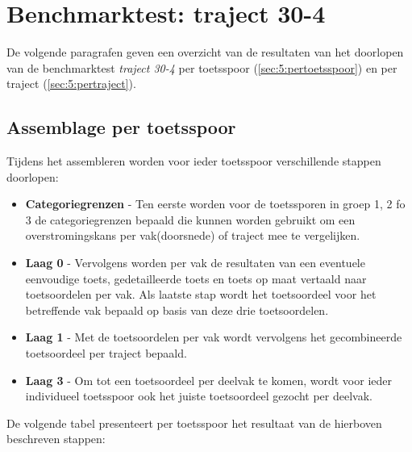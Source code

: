 \section{Benchmarktest: traject 30-4}
	\label{ch:benchmarktTest5}
De volgende paragrafen geven een overzicht van de resultaten van het doorlopen van de benchmarktest \textit{traject 30-4} per toetsspoor (\autoref{sec:5:pertoetsspoor}) en per traject (\autoref{sec:5:pertraject}).

\subsection{Assemblage per toetsspoor}
	\label{sec:5:pertoetsspoor}
Tijdens het assembleren worden voor ieder toetsspoor verschillende stappen doorlopen:
\begin{itemize}
	\item \textbf{Categoriegrenzen} - Ten eerste worden voor de toetssporen in groep 1, 2 fo 3 de categoriegrenzen bepaald die kunnen worden gebruikt om een overstromingskans per vak(door\-snede) of traject mee te vergelijken.
	\item \textbf{Laag 0} - Vervolgens worden per vak de resultaten van een eventuele eenvoudige toets, gedetailleerde toets en toets op maat vertaald naar toets\-oordelen per vak. Als laatste stap wordt het toetsoordeel voor het betreffende vak bepaald op basis van deze drie toetsoordelen.
	\item \textbf{Laag 1} - Met de toetsoordelen per vak wordt vervolgens het gecombineerde toetsoordeel per traject bepaald.
	\item \textbf{Laag 3} - Om tot een toetsoordeel per deelvak te komen, wordt voor ieder individueel toetsspoor ook het juiste toetsoordeel gezocht per deelvak.
\end{itemize}

De volgende tabel presenteert per toetsspoor het resultaat van de hierboven beschreven stappen:

